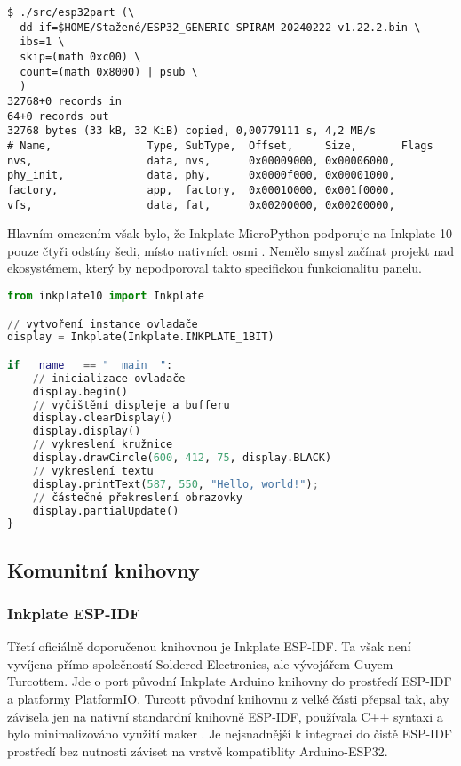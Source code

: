 \begin{lstlisting}[label=src:micropython-spiram-partition-table,caption={Tabulka oddílů vyčtena z MicroPython firmwaru pomocí nástroje esp32part}]
$ ./src/esp32part (\
  dd if=$HOME/Stažené/ESP32_GENERIC-SPIRAM-20240222-v1.22.2.bin \
  ibs=1 \
  skip=(math 0xc00) \
  count=(math 0x8000) | psub \
  )
32768+0 records in
64+0 records out
32768 bytes (33 kB, 32 KiB) copied, 0,00779111 s, 4,2 MB/s
# Name,               Type, SubType,  Offset,     Size,       Flags
nvs,                  data, nvs,      0x00009000, 0x00006000, 
phy_init,             data, phy,      0x0000f000, 0x00001000, 
factory,              app,  factory,  0x00010000, 0x001f0000, 
vfs,                  data, fat,      0x00200000, 0x00200000,
\end{lstlisting}

Hlavním omezením však bylo, že Inkplate MicroPython podporuje na Inkplate 10 pouze čtyři odstíny šedi, místo nativních osmi \cite{RenameINKPLATE_2BITINKPLATE_3BIT}. Nemělo smysl začínat projekt nad ekosystémem, který by nepodporoval takto specifickou funkcionalitu panelu.

\begin{lstlisting}[label=src:micropython-hello-world,language=Python,caption={Ukázka programu pro vykreslení kružnice a Hello World řetězce pomocí MicroPython knihovny}]
from inkplate10 import Inkplate

// vytvoření instance ovladače
display = Inkplate(Inkplate.INKPLATE_1BIT)

if __name__ == "__main__":
    // inicializace ovladače
    display.begin()
    // vyčištění displeje a bufferu
    display.clearDisplay()
    display.display()
    // vykreslení kružnice
    display.drawCircle(600, 412, 75, display.BLACK)
    // vykreslení textu
    display.printText(587, 550, "Hello, world!");
    // částečné překreslení obrazovky
    display.partialUpdate()
}
\end{lstlisting}

\subsection{Komunitní knihovny}
\subsubsection{Inkplate ESP-IDF}

Třetí oficiálně doporučenou knihovnou je Inkplate ESP-IDF. Ta však není vyvíjena přímo společností Soldered Electronics, ale vývojářem Guyem Turcottem. Jde o port původní Inkplate Arduino knihovny do prostředí ESP-IDF a platformy PlatformIO. Turcott původní knihovnu z velké části přepsal tak, aby závisela jen na nativní standardní knihovně ESP-IDF, používala C++ syntaxi a bylo minimalizováno využití maker \cite{ESPIDFInkPlateREADMEMd}. Je nejsnadnější k integraci do čistě ESP-IDF prostředí bez nutnosti záviset na vrstvě kompatiblity Arduino-ESP32.

